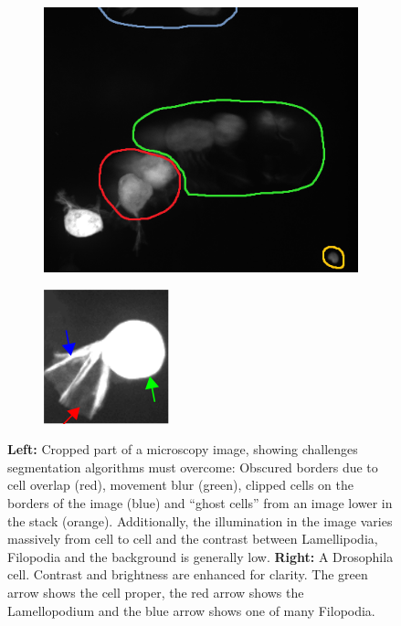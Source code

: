 \begin {figure}[!ht]	
	\centering
	\begin {subfigure}[t]{0.50\linewidth}
		\includegraphics[scale=0.55]{img/fig_problems.png}
	\end {subfigure}
	\hspace{1cm}
	\begin {subfigure}[t]{0.40\linewidth}
		\includegraphics[scale=1.470]{img/fig_cell_example.png}
	\end {subfigure}

	\caption[Segmentation challenges and cell parts.]{\textbf{Left:} Cropped part of a microscopy image, showing challenges segmentation algorithms must overcome: Obscured borders due to cell overlap (red), movement blur (green), clipped cells on the borders of the image (blue) and ``ghost cells'' from an image lower in the stack (orange). Additionally, the illumination in the image varies massively from cell to cell and the contrast between Lamellipodia, Filopodia and the background is generally low. \textbf{Right:} A Drosophila cell. Contrast and brightness are enhanced for clarity. The green arrow shows the cell proper, the red arrow shows the Lamellopodium and the blue arrow shows one of many Filopodia.}
	\label{fig:cell_example}
\end {figure}


